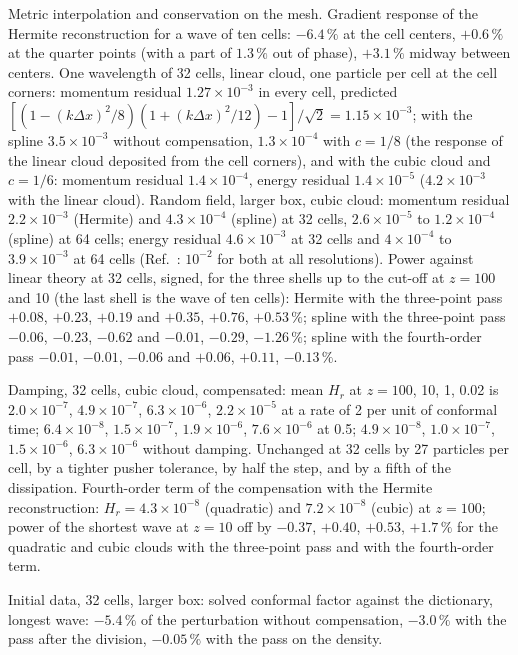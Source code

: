 \documentclass[aps,prd,twocolumn,10pt,superscriptaddress,nofootinbib,longbibliography,floatfix]{revtex4-2}
\begin{document}
Metric interpolation and conservation on the mesh. Gradient response of the Hermite reconstruction for a wave of ten cells: $-6.4\,\%$ at the cell centers, $+0.6\,\%$ at the quarter points (with a part of $1.3\,\%$ out of phase), $+3.1\,\%$ midway between centers. One wavelength of 32 cells, linear cloud, one particle per cell at the cell corners: momentum residual $1.27\times10^{-3}$ in every cell, predicted $[(1-(k\Delta x)^2/8)(1+(k\Delta x)^2/12)-1]/\sqrt2 = 1.15\times10^{-3}$; with the spline $3.5\times10^{-3}$ without compensation, $1.3\times10^{-4}$ with $c = 1/8$ (the response of the linear cloud deposited from the cell corners), and with the cubic cloud and $c = 1/6$: momentum residual $1.4\times10^{-4}$, energy residual $1.4\times10^{-5}$ ($4.2\times10^{-3}$ with the linear cloud). Random field, larger box, cubic cloud: momentum residual $2.2\times10^{-3}$ (Hermite) and $4.3\times10^{-4}$ (spline) at 32 cells, $2.6\times10^{-5}$ to $1.2\times10^{-4}$ (spline) at 64 cells; energy residual $4.6\times10^{-3}$ at 32 cells and $4\times10^{-4}$ to $3.9\times10^{-3}$ at 64 cells (Ref.~\cite{Daverio:2019gql}: $10^{-2}$ for both at all resolutions). Power against linear theory at 32 cells, signed, for the three shells up to the cut-off at $z = 100$ and 10 (the last shell is the wave of ten cells): Hermite with the three-point pass $+0.08$, $+0.23$, $+0.19$ and $+0.35$, $+0.76$, $+0.53\,\%$; spline with the three-point pass $-0.06$, $-0.23$, $-0.62$ and $-0.01$, $-0.29$, $-1.26\,\%$; spline with the fourth-order pass $-0.01$, $-0.01$, $-0.06$ and $+0.06$, $+0.11$, $-0.13\,\%$.

Damping, 32 cells, cubic cloud, compensated: mean $H_r$ at $z = 100$, 10, 1, 0.02 is $2.0\times10^{-7}$, $4.9\times10^{-7}$, $6.3\times10^{-6}$, $2.2\times10^{-5}$ at a rate of 2 per unit of conformal time; $6.4\times10^{-8}$, $1.5\times10^{-7}$, $1.9\times10^{-6}$, $7.6\times10^{-6}$ at 0.5; $4.9\times10^{-8}$, $1.0\times10^{-7}$, $1.5\times10^{-6}$, $6.3\times10^{-6}$ without damping. Unchanged at 32 cells by 27 particles per cell, by a tighter pusher tolerance, by half the step, and by a fifth of the dissipation. Fourth-order term of the compensation with the Hermite reconstruction: $H_r = 4.3\times10^{-8}$ (quadratic) and $7.2\times10^{-8}$ (cubic) at $z = 100$; power of the shortest wave at $z = 10$ off by $-0.37$, $+0.40$, $+0.53$, $+1.7\,\%$ for the quadratic and cubic clouds with the three-point pass and with the fourth-order term.

Initial data, 32 cells, larger box: solved conformal factor against the dictionary, longest wave: $-5.4\,\%$ of the perturbation without compensation, $-3.0\,\%$ with the pass after the division, $-0.05\,\%$ with the pass on the density.
\end{document}
